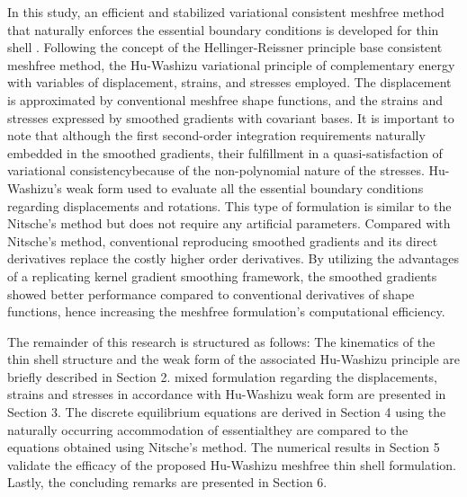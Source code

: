 In this study, an efficient and stabilized variational consistent meshfree method that naturally enforces the essential boundary conditions is developed for thin shell \DIFdelbegin {}\DIFdelend \DIFaddbegin {}\DIFaddend . Following the concept of the Hellinger-Reissner principle base consistent meshfree method, the Hu-Washizu variational principle of complementary energy with variables of displacement, strains, and stresses \DIFdelbegin {}\DIFdelend \DIFaddbegin {}\DIFaddend employed. The displacement is approximated by conventional meshfree shape functions, and the strains and stresses \DIFdelbegin {}\DIFdelend \DIFaddbegin {}\DIFaddend expressed by smoothed gradients with covariant bases. It is important to note that although the first second-order integration requirements \DIFdelbegin {}\DIFdelend \DIFaddbegin {}\DIFaddend naturally embedded in the smoothed gradients, their fulfillment \DIFdelbegin {}\DIFdelend \DIFaddbegin {}\DIFaddend in a quasi-satisfaction of variational consistency\DIFaddbegin {}\DIFaddend because of the non-polynomial nature of the stresses. Hu-Washizu's weak form \DIFdelbegin {}\DIFdelend \DIFaddbegin {}\DIFaddend used to evaluate all the essential boundary conditions regarding displacements and rotations. This type of formulation is similar to the Nitsche's method but does not require any artificial parameters. Compared with Nitsche’s method, conventional reproducing smoothed gradients and its direct derivatives replace the costly higher order derivatives. By utilizing the advantages of a replicating kernel gradient smoothing framework, the smoothed gradients showed better performance compared to conventional derivatives of shape functions, hence increasing the meshfree formulation's computational efficiency.

The remainder of this research \DIFdelbegin {}\DIFdelend \DIFaddbegin {}\DIFaddend is structured as follows: The kinematics of the thin shell structure and the weak form of the associated Hu-Washizu principle are briefly described in Section 2. \DIFdelbegin {}\DIFdelend \DIFaddbegin {}\DIFaddend mixed formulation regarding the displacements, strains and stresses in accordance with Hu-Washizu weak form are presented in Section 3. The discrete equilibrium equations are derived in Section 4 using the naturally occurring accommodation of essential\DIFdelbegin {}\DIFdelend \DIFaddbegin {}\DIFaddend they are compared to the equations obtained using Nitsche's method. The numerical results in Section 5 validate the efficacy of the proposed Hu-Washizu meshfree thin shell formulation. Lastly, the concluding remarks are presented in Section 6.

